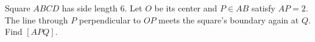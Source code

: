 Square $ABCD$ has side length $6$. Let $O$ be its center and $P\in AB$ satisfy $AP=2$. The line through $P$ perpendicular to $OP$ meets the square's boundary again at $Q$. Find $[APQ]$.
